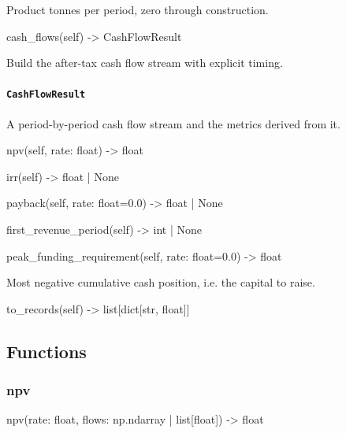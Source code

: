 \documentclass[10pt,a4paper,twoside]{report}
\begin{document}
Product tonnes per period, zero through construction.

\begin{verbatimsmall}
cash_flows(self) -> CashFlowResult
\end{verbatimsmall}

Build the after-tax cash flow stream with explicit timing.

\paragraph{\texttt{CashFlowResult}}

A period-by-period cash flow stream and the metrics derived from it.

\begin{verbatimsmall}
npv(self, rate: float) -> float
\end{verbatimsmall}

\begin{verbatimsmall}
irr(self) -> float | None
\end{verbatimsmall}

\begin{verbatimsmall}
payback(self, rate: float=0.0) -> float | None
\end{verbatimsmall}

\begin{verbatimsmall}
first_revenue_period(self) -> int | None
\end{verbatimsmall}

\begin{verbatimsmall}
peak_funding_requirement(self, rate: float=0.0) -> float
\end{verbatimsmall}

Most negative cumulative cash position, i.e. the capital to raise.

\begin{verbatimsmall}
to_records(self) -> list[dict[str, float]]
\end{verbatimsmall}

\subsection*{Functions}

\subsubsection*{npv}

\begin{verbatimsmall}
npv(rate: float, flows: np.ndarray | list[float]) -> float
\end{verbatimsmall}
\end{document}
